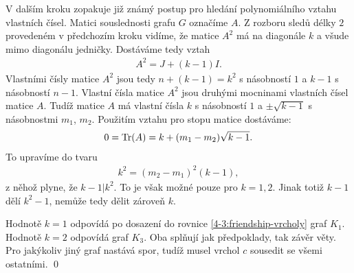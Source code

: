 V dalším kroku zopakuje již známý postup pro hledání polynomiálního vztahu vlastních čísel. Matici souslednosti grafu $G$ označíme $A$.
Z rozboru sledů délky $2$ provedeném v předchozím kroku vidíme, že matice $A^2$ má na diagonále $k$ a všude mimo diagonálu jedničky. Dostáváme tedy vztah
\begin{align}
A^2 = J + (k-1)I.
\end{align}
Vlastními čísly matice $A^2$ jsou tedy $n+(k-1) = k^2$ s násobností $1$ a $k-1$ s násobností $n-1$. Vlastní čísla matice $A^2$ jsou druhými mocninami vlastních čísel matice $A$.  
Tudíž matice $A$ má vlastní čísla $k$ s násobností $1$ a $\pm \sqrt{k-1}$ s násobnostmi $m_1$, $m_2$.
Použitím vztahu pro stopu matice dostáváme:
\begin{align}
0 = \operatorname{Tr}(A) = k + (m_1 -m_2)\sqrt{k-1}.
\end{align}
To upravíme do tvaru
\begin{align}
k^2 = (m_2 -m_1)^2(k-1),
\end{align}
z něhož plyne, že $k-1|k^2$. To je však možné pouze pro $k = 1,2$. Jinak totiž $k-1$ dělí $k^2-1$, nemůže tedy dělit zároveň $k$. 

Hodnotě $k=1$ odpovídá po dosazení do rovnice \ref{4-3:friendship-vrcholy} graf $K_1$.
Hodnotě $k=2$ odpovídá graf $K_3$. 
Oba splňují jak předpoklady, tak závěr věty. 
Pro jakýkoliv jiný graf nastává spor, tudíž musel vrchol $c$ sousedit se všemi ostatními.
\qed
